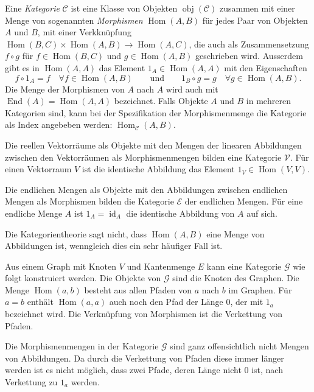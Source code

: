 \begin{definition}
Eine {\em Kategorie} $\mathscr{C}$ ist eine Klasse von Objekten
$\operatorname{obj}(\mathscr{C})$ zusammen mit einer
Menge von sogenannten {\em Morphismen} $\operatorname{Hom}(A,B)$ für
jedes Paar von Objekten $A$ und $B$, mit einer Verkknüpfung
$
\operatorname{Hom}(B,C)\times \operatorname{Hom}(A,B)
\to
\operatorname{Hom}(A,C)
$, die auch als Zusammensetzung $f\circ g$ für $f\in \operatorname{Hom}(B,C)$
und $g\in \operatorname{Hom}(A,B)$ geschrieben wird.
Ausserdem gibt es in $\operatorname{Hom}(A,A)$ das Element
$1_A\in\operatorname{Hom}(A,A)$ mit den Eigenschaften
\[
f\circ 1_A = f\quad\forall f\in \operatorname{Hom}(A,B)
\qquad\text{und}\qquad
1_B\circ g = g\quad\forall g\in\operatorname{Hom}(A,B).
\]
Die Menge der Morphismen von $A$ nach $A$ wird auch mit
$\operatorname{End}(A)=\operatorname{Hom}(A,A)$ bezeichnet.
Falls Objekte $A$ und $B$ in mehreren Kategorien sind, kann bei der
Spezifikation der Morphismenmenge die Kategorie als Index
angebeben werden: $\operatorname{Hom}_{\mathscr{C}}(A,B)$.
\end{definition}

\begin{beispiel}
Die reellen Vektorräume als Objekte mit den Mengen der linearen
Abbildungen zwischen den Vektorräumen als Morphismenmengen bilden
eine Kategorie $\mathscr{V}$.
Für einen Vektorraum $V$ ist die identische Abbildung das Element
$1_V\in\operatorname{Hom}(V,V)$.
\end{beispiel}

\begin{beispiel}
Die endlichen Mengen als Objekte mit den Abbildungen zwischen
endlichen Mengen als Morphismen bilden die Kategorie $\mathscr{E}$
der endlichen Mengen.
Für eine endliche Menge $A$ ist $1_A=\operatorname{id}_A$ die
identische Abbildung von $A$ auf sich.
\end{beispiel}

Die Kategorientheorie sagt nicht, dass $\operatorname{Hom}(A,B)$
eine Menge von Abbildungen ist, wenngleich dies ein sehr häufiger
Fall ist.

\begin{beispiel}
Aus einem Graph mit Knoten $V$ und Kantenmenge $E$ kann eine Kategorie
$\mathscr{G}$ wie folgt konstruiert werden.
Die Objekte von $\mathscr{G}$ sind die Knoten des Graphen.
Die Menge $\operatorname{Hom}(a,b)$ besteht aus allen Pfaden
von $a$ nach $b$ im Graphen.
Für $a=b$ enthält $\operatorname{Hom}(a,a)$ auch noch den Pfad der
Länge $0$, der mit $1_a$ bezeichnet wird.
Die Verknüpfung von Morphismen ist die Verkettung von Pfaden.

Die Morphismenmengen in der Kategorie $\mathscr{G}$ sind ganz offensichtlich
nicht Mengen von Abbildungen.
Da durch die Verkettung von Pfaden diese immer länger werden ist es
nicht möglich, dass zwei Pfade, deren Länge nicht $0$ ist, nach
Verkettung zu $1_a$ werden.
\end{beispiel}

